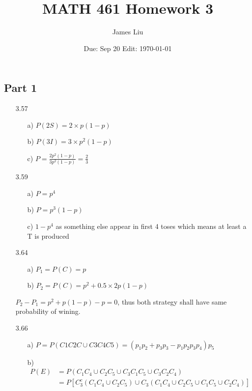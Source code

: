 \documentclass{article}
\date{Due: Sep 20  Edit: \today}
\title{MATH 461 Homework 3}
\author{James Liu}
\begin{document}
\maketitle
\subsection*{Part 1}
\begin{itemize}
    \item [3.57]
    \begin{itemize}
        \item [a)] \(\displaystyle
        P(2S) = 2\times p(1-p)
        \)
        \item [b)]\(\displaystyle
        P(3I) = 3\times p^2(1-p)
        \)
        \item [c)]\(\displaystyle
        P = \frac{2p^2(1-p)}{3p^2(1-p)}=\frac{2}{3}
        \)
    \end{itemize}
    \item [3.59]
    \begin{itemize}
        \item [a)]\(\displaystyle
        P = p^4
        \)
        \item [b)]\(\displaystyle
        P = p^3(1-p)
        \)
        \item [c)]\(\displaystyle
        1-p^4
        \) as something else appear in first 4 toses which means at least a T is produced
    \end{itemize}
    \item [3.64]
    \begin{itemize}
        \item [a)]\(\displaystyle
        P_1 = P(C) = p
        \)
        \item [b)]\(\displaystyle
        P_2 = P(C) = p^2+0.5\times 2p(1-p)
        \)
    \end{itemize}
    \(P_2-P_1 = p^2+p(1-p)-p=0\), thus both strategy shall have same probability of wining.
    \item [3.66]
    \begin{itemize}
        \item [a)]\(P = P(C1C2C\cup C3C4C5) = (p_1p_2+p_3p_3-p_1p_2p_3p_4)p_5\) 
        \item [b)]\begin{align*}
P(E) &= P(C_1C_4 \cup C_2C_5 \cup C_3C_1C_5 \cup C_3C_2C_4)\\
&= P\left[C_3^c(C_1C_4 \cup C_2C_5) \cup C_3(C_1C_4 \cup C_2C_5 \cup C_1C_5 \cup C_2C_4)\right]\\

\end{align*}
\end{itemize}
\end{itemize}
\end{document}
